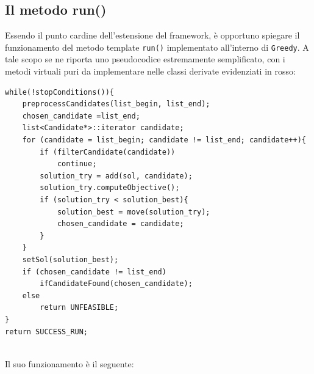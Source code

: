 \subsection{Il metodo run()}
Essendo il punto cardine dell'estensione del framework, è opportuno spiegare il funzionamento del metodo template \texttt{run()} implementato all'interno di \texttt{Greedy}. A tale scopo se ne riporta uno pseudocodice estremamente semplificato, con i metodi virtuali puri da implementare nelle classi derivate evidenziati in rosso:
\newpage
\begin{lstlisting}
while(!stopConditions()){
    preprocessCandidates(list_begin, list_end);
    chosen_candidate =list_end;
    list<Candidate*>::iterator candidate;
    for (candidate = list_begin; candidate != list_end; candidate++){
        if (filterCandidate(candidate))
            continue;
        solution_try = add(sol, candidate);
        solution_try.computeObjective();
        if (solution_try < solution_best){
            solution_best = move(solution_try);
            chosen_candidate = candidate;
        }  
    }
    setSol(solution_best);
    if (chosen_candidate != list_end)
        ifCandidateFound(chosen_candidate);
    else
        return UNFEASIBLE;
}
return SUCCESS_RUN;
\end{lstlisting}
\noindent
\\
Il suo funzionamento è il seguente:
